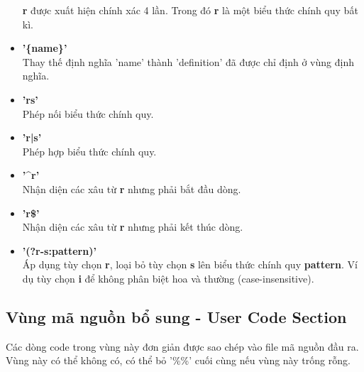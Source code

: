 \documentclass[../report.tex]{subfiles}
\begin{document}
\begin{itemize}
    \textbf{r} được xuất hiện chính xác 4 lần. Trong đó \textbf{r} là một biểu thức chính quy bất kì. 
\item \textbf{'\{name\}'} \\
    Thay thế định nghĩa 'name' thành 'definition' đã được chỉ định ở vùng định nghĩa. 
\item \textbf{'rs'} \\
    Phép nối biểu thức chính quy. 
\item \textbf{'r|s'} \\
    Phép hợp biểu thức chính quy. 
\item \textbf{'\textasciicircum r'} \\
    Nhận diện các xâu từ \textbf{r} nhưng phải bắt đầu dòng. 
\item \textbf{'r\$'} \\
    Nhận diện các xâu từ \textbf{r} nhưng phải kết thúc dòng. 
\item \textbf{'(?r-s:pattern)'} \\
    Áp dụng tùy chọn \textbf{r}, loại bỏ tùy chọn \textbf{s} lên biểu thức chính quy \textbf{pattern}.
    Ví dụ tùy chọn \textbf{i} để không phân biệt hoa và thường (case-insensitive).
    
\end{itemize}

\subsection{Vùng mã nguồn bổ sung - User Code Section}
Các dòng code trong vùng này đơn giản được sao chép vào file mã nguồn đầu ra. 
Vùng này có thể không có, có thể bỏ '\%\%' cuối cùng nếu vùng này trống rỗng.  
\end{document}
